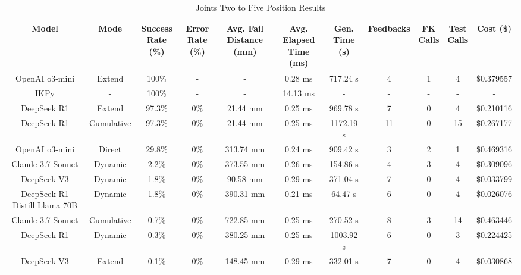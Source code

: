 \begin{landscape}
\begin{table}[H]
\tiny
\renewcommand{\arraystretch}{1.2}
\caption{Joints Two to Five Position Results}
\begin{center}
\begin{tabular}{|c|c|c|c|c|c|c|c|c|c|c|}
    \hline
    \textbf{Model} & 
    \textbf{Mode} & 
    \makecell{\textbf{Success}\\\textbf{Rate (\%)}} &
    \makecell{\textbf{Error}\\\textbf{Rate (\%)}} &
    \makecell{\textbf{Avg. Fail}\\\textbf{Distance (mm)}} &
    \makecell{\textbf{Avg. Elapsed}\\\textbf{Time (ms)}} &
    \makecell{\textbf{Gen.}\\\textbf{Time (s)}} &
    \textbf{Feedbacks} &
    \makecell{\textbf{FK}\\\textbf{Calls}} &
    \makecell{\textbf{Test}\\\textbf{Calls}} &
    \textbf{Cost (\$)} \\
    \hline
    OpenAI o3-mini & Extend & 100\% & - & - & 0.28 ms & 717.24 s & 4 & 1 & 4 & \$0.379557 \\
    \hline
    IKPy & - & 100\% & - & - & 14.13 ms & - & - & - & - & - \\
    \hline
    DeepSeek R1 & Extend & 97.3\% & 0\% & 21.44 mm & 0.25 ms & 969.78 s & 7 & 0 & 4 & \$0.210116 \\
    \hline
    DeepSeek R1 & Cumulative & 97.3\% & 0\% & 21.44 mm & 0.25 ms & 1172.19 s & 11 & 0 & 15 & \$0.267177 \\
    \hline
    OpenAI o3-mini & Direct & 29.8\% & 0\% & 313.74 mm & 0.24 ms & 909.42 s & 3 & 2 & 1 & \$0.469316 \\
    \hline
    Claude 3.7 Sonnet & Dynamic & 2.2\% & 0\% & 373.55 mm & 0.26 ms & 154.86 s & 4 & 3 & 4 & \$0.309096 \\
    \hline
    DeepSeek V3 & Dynamic & 1.8\% & 0\% & 90.58 mm & 0.29 ms & 371.04 s & 7 & 0 & 4 & \$0.033799 \\
    \hline
    DeepSeek R1 Distill Llama 70B & Dynamic & 1.8\% & 0\% & 390.31 mm & 0.21 ms & 64.47 s & 6 & 0 & 4 & \$0.026076 \\
    \hline
    Claude 3.7 Sonnet & Cumulative & 0.7\% & 0\% & 722.85 mm & 0.25 ms & 270.52 s & 8 & 3 & 14 & \$0.463446 \\
    \hline
    DeepSeek R1 & Dynamic & 0.3\% & 0\% & 380.25 mm & 0.25 ms & 1003.92 s & 6 & 0 & 3 & \$0.224425 \\
    \hline
    DeepSeek V3 & Extend & 0.1\% & 0\% & 148.45 mm & 0.29 ms & 332.01 s & 7 & 0 & 4 & \$0.030868 \\

\end{tabular}
\end{center}
\end{table}
\end{landscape}
